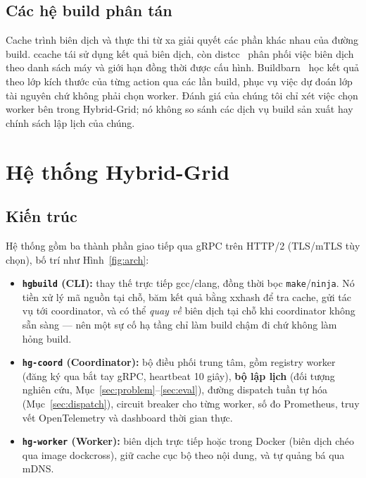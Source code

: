 \documentclass[final,5p,times,twocolumn]{elsarticle}
\begin{document}
\subsection{Các hệ build phân tán}

Cache trình biên dịch và thực thi từ xa giải quyết các phần khác nhau của đường build. ccache tái sử dụng kết quả biên dịch, còn distcc~\cite{distcc} phân phối việc biên dịch theo danh sách máy và giới hạn đồng thời được cấu hình. Buildbarn~\cite{buildbarn} học kết quả theo lớp kích thước của từng action qua các lần build, phục vụ việc dự đoán lớp tài nguyên chứ không phải chọn worker. Đánh giá của chúng tôi chỉ xét việc chọn worker bên trong Hybrid-Grid; nó không so sánh các dịch vụ build sản xuất hay chính sách lập lịch của chúng.

\section{Hệ thống Hybrid-Grid}
\label{sec:system}

\subsection{Kiến trúc}

Hệ thống gồm ba thành phần giao tiếp qua gRPC trên HTTP/2 (TLS/mTLS tùy chọn), bố trí như Hình~\ref{fig:arch}:

\begin{itemize}
\item \textbf{\texttt{hgbuild} (CLI):} thay thế trực tiếp gcc/clang, đồng thời bọc \texttt{make}/\texttt{ninja}. Nó tiền xử lý mã nguồn tại chỗ, băm kết quả bằng xxhash để tra cache, gửi tác vụ tới coordinator, và có thể \emph{quay về} biên dịch tại chỗ khi coordinator không sẵn sàng --- nên một sự cố hạ tầng chỉ làm build chậm đi chứ không làm hỏng build.
\item \textbf{\texttt{hg-coord} (Coordinator):} bộ điều phối trung tâm, gồm registry worker (đăng ký qua bắt tay gRPC, heartbeat 10 giây), \textbf{bộ lập lịch} (đối tượng nghiên cứu, Mục~\ref{sec:problem}--\ref{sec:eval}), đường dispatch tuần tự hóa (Mục~\ref{sec:dispatch}), circuit breaker cho từng worker, số đo Prometheus, truy vết OpenTelemetry và dashboard thời gian thực.
\item \textbf{\texttt{hg-worker} (Worker):} biên dịch trực tiếp hoặc trong Docker (biên dịch chéo qua image dockcross), giữ cache cục bộ theo nội dung, và tự quảng bá qua mDNS.
\end{itemize}
\end{document}
